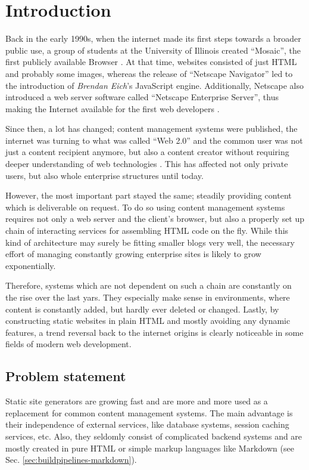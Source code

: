 \chapter{Introduction}
\label{cha:introduction}
Back in the early 1990s, when the internet made its first steps towards a broader public use, a group of students at the University of Illinois created ``Mosaic'', the first publicly available Browser \cite[11]{dhillon2016}. At that time, websites consisted of just HTML and probably some images, whereas the release of ``Netscape Navigator'' led to the introduction of \emph{Brendan Eich}'s JavaScript engine. Additionally, Netscape also introduced a web server software called ``Netscape Enterprise Server'', thus making the Internet available for the first web developers \cite[12]{dhillon2016}.

Since then, a lot has changed; content management systems were published, the internet was turning to what was called ``Web 2.0'' and the common user was not just a content recipient anymore, but also a content creator without requiring deeper understanding of web technologies \cite[19]{dhillon2016}. This has affected not only private users, but also whole enterprise structures until today.

However, the most important part stayed the same; steadily providing content which is deliverable on request. To do so using content management systems requires not only a web server and the client's browser, but also a properly set up chain of interacting services for assembling HTML code on the fly. While this kind of architecture may surely be fitting smaller blogs very well, the necessary effort of managing constantly growing enterprise sites is likely to grow exponentially.

Therefore, systems which are not dependent on such a chain are constantly on the rise over the last yars. They especially make sense in environments, where content is constantly added, but hardly ever deleted or changed. Lastly, by constructing static websites in plain HTML and mostly avoiding any dynamic features, a trend reversal back to the internet origins is clearly noticeable in some fields of modern web development.

\section{Problem statement}
\label{sec:staticsitegenerators}
Static site generators are growing fast and are more and more used as a replacement for common content management systems. The main advantage is their independence of external services, like database systems, session caching services, etc. Also, they seldomly consist of complicated backend systems and are mostly created in pure HTML or simple markup languages like Markdown (see Sec. \ref{sec:buildpipelines-markdown}).

